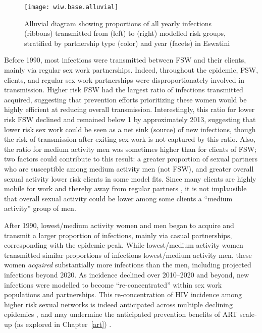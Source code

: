 \begin{figure}
  \texttt{[image: wiw.base.alluvial]}
  \caption{Alluvial diagram showing proportions of all yearly infections (ribbons)
    transmitted from (left) to (right) modelled risk groups,
    stratified by partnership type (color) and year (facets) in Eswatini}
  \label{fig:wiw.base.alluvial}
\end{figure}
\par
Before 1990, most infections were transmitted between FSW and their clients,
mainly via regular sex work partnerships.
Indeed, throughout the epidemic, FSW, clients, and regular sex work partnerships
were disproportionately involved in transmission.
Higher risk FSW had the largest ratio of infections transmitted \vs acquired,
suggesting that prevention efforts prioritizing these women
would be highly efficient at reducing overall transmission.
Interestingly, this ratio for lower risk FSW declined and remained below 1
by approximately 2013, %
suggesting that lower risk sex work could be seen as a net sink (\vs source) of new infections,
though the risk of transmission after exiting sex work is not captured by this ratio.
Also, the ratio for medium activity men was sometimes higher than for clients of FSW;
two factors could contribute to this result:
a greater proportion of sexual partners who are susceptible among medium activity men (\ie not FSW),
and greater overall sexual activity \vs lower risk clients in some model fits.
Since many clients are highly mobile for work
and thereby away from regular partners \cite{Carael2006,Matovu2012,Makhakhe2017},
it is not implausible that overall sexual activity could be
lower among some clients \vs a ``medium activity'' group of men.
\par
After 1990, lowest/medium activity women and men began to acquire and transmit
a larger proportion of infections, mainly via casual partnerships,
corresponding with the epidemic peak.
While lowest/medium activity women transmitted similar proportions of infections
\vs lowest/medium activity men,
these women \emph{acquired} substantially more infections than the men,
including projected infections beyond 2020.
As incidence declined over 2010--2020 and beyond,
new infections were modelled to become ``re-concentrated''
within sex work populations and partnerships.
This re-concentration of HIV incidence among higher risk sexual networks
is indeed anticipated across multiple declining epidemics \cite{Brown2019,Ortblad2019},
and may undermine the anticipated prevention benefits of ART scale-up
(as explored in Chapter~\ref{art}) \cite{Baral2019}.
